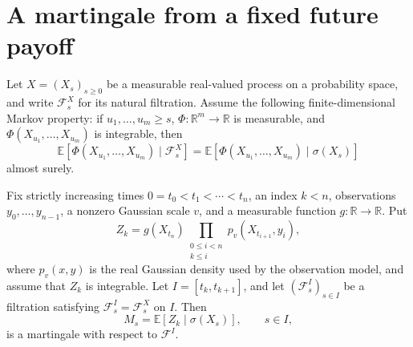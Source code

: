 \chapter{A martingale from a fixed future payoff}

\begin{theorem}
  \label{thm:martingale-property}
  Let $X=(X_s)_{s\geq 0}$ be a measurable real-valued process on a
  probability space, and write $\mathcal F^X_s$ for its natural
  filtration. Assume the following finite-dimensional Markov property: if
  $u_1,\ldots,u_m\geq s$, $\Phi:\mathbb R^m\to\mathbb R$ is measurable,
  and $\Phi(X_{u_1},\ldots,X_{u_m})$ is integrable, then
  \[
    \mathbb E[\Phi(X_{u_1},\ldots,X_{u_m})\mid\mathcal F^X_s]
    =
    \mathbb E[\Phi(X_{u_1},\ldots,X_{u_m})\mid\sigma(X_s)]
  \]
  almost surely.

  Fix strictly increasing times $0=t_0<t_1<\cdots<t_n$, an index
  $k<n$, observations $y_0,\ldots,y_{n-1}$, a nonzero Gaussian scale
  $v$, and a measurable function $g:\mathbb R\to\mathbb R$. Put
  \[
    Z_k=g(X_{t_n})
      \prod_{\substack{0\leq i<n\\ k\leq i}}
        p_v(X_{t_{i+1}},y_i),
  \]
  where $p_v(x,y)$ is the real Gaussian density used by the observation
  model, and assume that $Z_k$ is integrable. Let
  $I=[t_k,t_{k+1}]$, and let $(\mathcal F^I_s)_{s\in I}$ be a filtration
  satisfying $\mathcal F^I_s=\mathcal F^X_s$ on $I$. Then
  \[
    M_s=\mathbb E[Z_k\mid\sigma(X_s)],\qquad s\in I,
  \]
  is a martingale with respect to $\mathcal F^I$.
\end{theorem}
